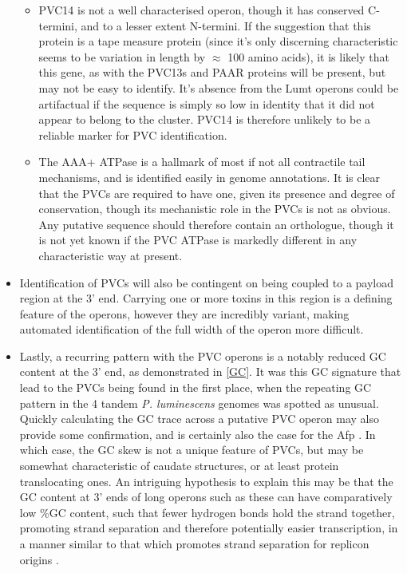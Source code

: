 \begin{itemize}
\begin{itemize}
	\item PVC14 is not a well characterised operon, though it has conserved C-termini, and to a lesser extent N-termini. If the suggestion that this protein is a tape measure protein (since it's only discerning characteristic seems to be variation in length by $\approx$ 100 amino acids), it is likely that this gene, as with the PVC13s and PAAR proteins will be present, but may not be easy to identify. It's absence from the Lumt operons could be artifactual if the sequence is simply so low in identity that it did not appear to belong to the cluster. PVC14 is therefore unlikely to be a reliable marker for PVC identification.
	\item The AAA+ ATPase is a hallmark of most if not all contractile tail mechanisms, and is identified easily in genome annotations. It is clear that the PVCs are required to have one, given its presence and degree of conservation, though its mechanistic role in the PVCs is not as obvious. Any putative sequence should therefore contain an orthologue, though it is not yet known if the PVC ATPase is markedly different in any characteristic way at present.
	\end{itemize}
\item Identification of PVCs will also be contingent on being coupled to a payload region at the 3' end. Carrying one or more toxins in this region is a defining feature of the operons, however they are incredibly variant, making automated identification of the full width of the operon more difficult.
\item Lastly, a recurring pattern with the PVC operons is a notably reduced GC content at the 3' end, as demonstrated in \vref{GC}. It was this GC signature that lead to the PVCs being found in the first place, when the repeating GC pattern in the 4 tandem \emph{P. luminescens} genomes was spotted as unusual. Quickly calculating the GC trace across a putative PVC operon may also provide some confirmation, and is certainly also the case for the Afp \citep{Hurst2004}. In which case, the GC skew is not a unique feature of PVCs, but may be somewhat characteristic of caudate structures, or at least protein translocating ones. An intriguing hypothesis to explain this may be that the GC content at 3' ends of long operons such as these can have comparatively low \%GC content, such that fewer hydrogen bonds hold the strand together, promoting strand separation and therefore potentially easier transcription, in a manner similar to that which promotes strand separation for replicon origins \citep{Artsimovitch2002}.
\end{itemize}

